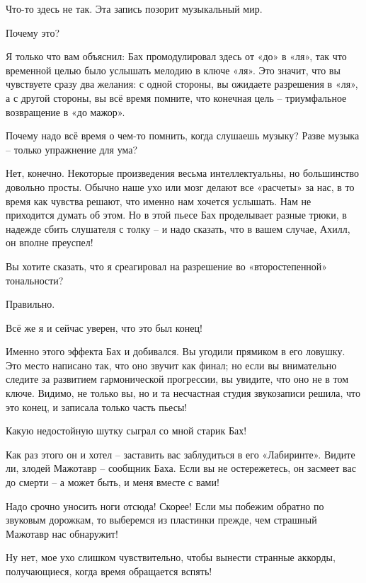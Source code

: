 \documentclass[../main.tex]{subfiles}
\begin{document}
\begin{Dialogue}
\begin{sublevel}
\begin{sublevel}
\begin{sublevel}
 Что-то здесь не так. Эта запись позорит музыкальный мир.

 Почему это?

 Я только что вам объяснил: Бах промодулировал здесь от «до» в «ля», так что временной целью было услышать мелодию в ключе «ля». Это значит, что вы чувствуете сразу два желания: с одной стороны, вы ожидаете разрешения в «ля», а с другой стороны, вы всё время помните, что конечная цель \--- триумфальное возвращение в «до мажор».

 Почему надо всё время о чем-то помнить, когда слушаешь музыку? Разве музыка \--- только упражнение для ума?

 Нет, конечно. Некоторые произведения весьма интеллектуальны, но большинство довольно просты. Обычно наше ухо или мозг делают все «расчеты» за нас, в то время как чувства решают, что именно нам хочется услышать. Нам не приходится думать об этом. Но в этой пьесе Бах проделывает разные трюки, в надежде сбить слушателя с толку \--- и надо сказать, что в вашем случае, Ахилл, он вполне преуспел!

 Вы хотите сказать, что я среагировал на разрешение во «второстепенной» тональности?

 Правильно.

 Всё же я и сейчас уверен, что это был конец!

 Именно этого эффекта Бах и добивался. Вы угодили прямиком в его ловушку. Это место написано так, что оно звучит как финал; но если вы внимательно следите за развитием гармонической прогрессии, вы увидите, что оно не в том ключе. Видимо, не только вы, но и та несчастная студия звукозаписи решила, что это конец, и записала только часть пьесы!

 Какую недостойную шутку сыграл со мной старик Бах!

 Как раз этого он и хотел \--- заставить вас заблудиться в его «Лабиринте». Видите ли, злодей Мажотавр \--- сообщник Баха. Если вы не остережетесь, он засмеет вас до смерти \--- а может быть, и меня вместе с вами!

 Надо срочно уносить ноги отсюда! Скорее! Если мы побежим обратно по звуковым дорожкам, то выберемся из пластинки прежде, чем страшный Мажотавр нас обнаружит!

 Ну нет, мое ухо слишком чувствительно, чтобы вынести странные аккорды, получающиеся, когда время обращается вспять!


\end{sublevel}
\end{sublevel}
\end{sublevel}
\end{Dialogue}
\end{document}
